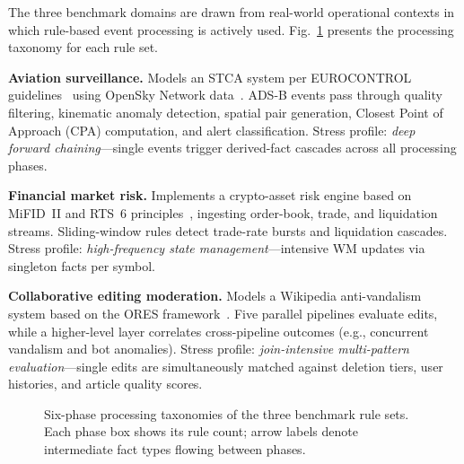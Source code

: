 The three benchmark domains are drawn from real-world operational contexts in which rule-based event processing is actively used.
Fig.~\ref{fig:taxonomy} presents the processing taxonomy for each rule set.

\textbf{Aviation surveillance.}
Models an STCA system per EUROCONTROL guidelines~\cite{eurocontrol_stca} using OpenSky Network data~\cite{schafer2014opensky}.
ADS-B events pass through quality filtering, kinematic anomaly detection, spatial pair generation, Closest Point of Approach (CPA) computation, and alert classification.
Stress profile: \emph{deep forward chaining}---single events trigger derived-fact cascades across all processing phases.

\textbf{Financial market risk.}
Implements a crypto-asset risk engine based on MiFID~II and RTS~6 principles~\cite{esma_mifid2_art17, eu_rts6_2017}, ingesting order-book, trade, and liquidation streams.
Sliding-window rules detect trade-rate bursts and liquidation cascades.
Stress profile: \emph{high-frequency state management}---intensive WM updates via singleton facts per symbol.

\textbf{Collaborative editing moderation.}
Models a Wikipedia anti-vandalism system based on the ORES framework~\cite{halfaker2020ores}.
Five parallel pipelines evaluate edits, while a higher-level layer correlates cross-pipeline outcomes (e.g., concurrent vandalism and bot anomalies).
Stress profile: \emph{join-intensive multi-pattern evaluation}---single edits are simultaneously matched against deletion tiers, user histories, and article quality scores.

\begin{figure}[t]
  \centering
  \hfill
  \par\bigskip
  \caption{Six-phase processing taxonomies of the three benchmark rule sets. Each phase box shows its rule count; arrow labels denote intermediate fact types flowing between phases.}\label{fig:taxonomy}
\end{figure}

